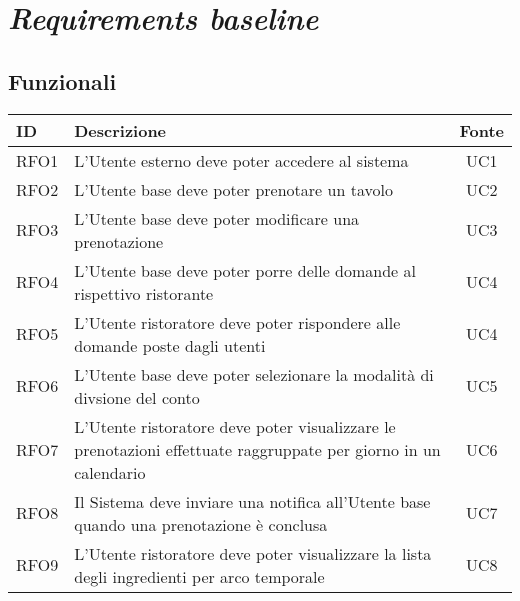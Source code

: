 \section{\textit{Requirements baseline}}

\subsection{Funzionali}

\begin{table}[h]
	\renewcommand{\arraystretch}{1.5}
	\centering
	\begin{tabularx}{\textwidth}{l|X|c}
		\textbf{ID} & \textbf{Descrizione}                                                                                                      & \textbf{Fonte} \\
		\hline
		RFO1        & L'Utente esterno deve poter accedere al sistema                                                                           & UC1            \\
		\hline
		RFO2        & L'Utente base deve poter prenotare un tavolo                                                                              & UC2            \\
		\hline
		RFO3        & L'Utente base deve poter modificare una prenotazione                                                                      & UC3            \\
		\hline
		RFO4        & L'Utente base deve poter porre delle domande al rispettivo ristorante                                                     & UC4            \\
		\hline
		RFO5        & L'Utente ristoratore deve poter rispondere alle domande poste dagli utenti                                                & UC4            \\
		\hline
		RFO6        & L'Utente base deve poter selezionare la modalità di divsione del conto                                                    & UC5            \\
		\hline
		RFO7        & L'Utente ristoratore deve poter visualizzare le prenotazioni effettuate raggruppate per giorno in un calendario           & UC6            \\
		\hline
		RFO8        & Il Sistema deve inviare una notifica all'Utente base quando una prenotazione è conclusa                                   & UC7            \\
		\hline
		RFO9        & L'Utente ristoratore deve poter visualizzare la lista degli ingredienti per arco temporale                                & UC8            \\

\end{tabularx}
\end{table}
